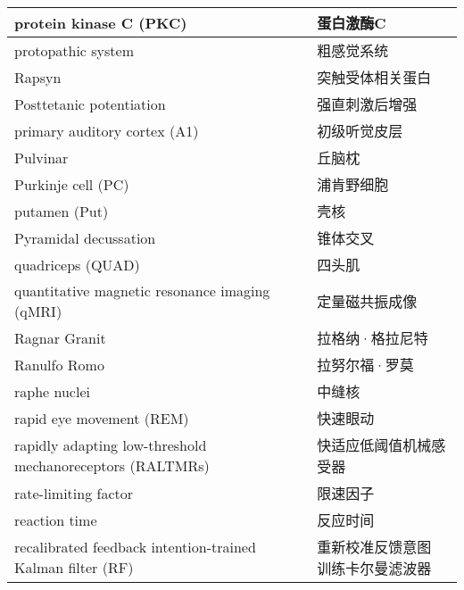 \begin{longtable}{lll}
	\midrule
	protein kinase C (PKC)   && 蛋白激酶C  \\
	
	\midrule
	protopathic system   && 粗感觉系统  \\
	
	\midrule
	Rapsyn   && 突触受体相关蛋白  \\
	
	\midrule
	Posttetanic potentiation   && 强直刺激后增强  \\
	
	\midrule
	primary auditory cortex (A1)   && 初级听觉皮层  \\
	
	\midrule
	Pulvinar   && 丘脑枕  \\
	
	\midrule
	Purkinje cell (PC)   && 浦肯野细胞  \\
	
	\midrule
	putamen (Put)   && 壳核  \\
	
	\midrule
	Pyramidal decussation   && 锥体交叉  \\
	
	\midrule
	quadriceps (QUAD)   && 四头肌  \\
	
	\midrule
	quantitative magnetic resonance imaging (qMRI) && 定量磁共振成像  \\
	
	\midrule
	Ragnar Granit   && 拉格纳·格拉尼特  \\
	
	\midrule
	Ranulfo Romo   && 拉努尔福·罗莫  \\
	
	\midrule
	raphe nuclei   && 中缝核  \\
	
	\midrule
	rapid eye movement (REM)   && 快速眼动  \\
	
	\midrule
	\makecell{rapidly adapting low-threshold\\ mechanoreceptors (RALTMRs)}  && 快适应低阈值机械感受器  \\
	
	\midrule
	rate-limiting factor  && 限速因子  \\
	
	\midrule
	reaction time  && 反应时间  \\
	
	\midrule
	\makecell{recalibrated feedback intention-trained\\ Kalman filter (RF)}   && \makecell{重新校准反馈意图\\训练卡尔曼滤波器}  \\
	

\end{longtable}
